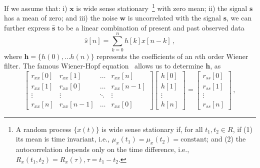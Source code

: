\documentclass[paper-main.tex]{subfiles}
\begin{document}
If we assume that: i) $\textbf{x}$ is wide sense stationary~\footnote{ A random process $\{x(t)\}$ is wide sense stationary if, for all $t_1,t_2 \in R$, if (1) its mean is time invariant, i.e., $\mu_x(t_1)=\mu_x(t_2)=\text{constant}$; and (2) the autocorrelation depends only on the time difference, i.e., $R_x(t_1,t_2)=R_x(\tau),\tau=t_1-t_2$.} with zero mean; ii) the signal $\textbf{s}$ has a mean of zero; and iii) the noise $\textbf{w}$ is uncorrelated with the signal $\textbf{s}$, we can further express $\hat{\textbf{s}}$ to be a linear combination of present and past observed data
\begin{equation}
\hat{{s}}[n]=\sum_{k=0}^{n}h[k]x[n-k]\,,
\end{equation}
where $\textbf{h}=\{h(0),\dots h(n)\}$ represents the coefficients of an $n$th order Wiener filter.
The famous Wiener-Hopf equation~\citep{noble1959methods} allows us to determine $\textbf{h}$, as\begin{equation}
\label{eqn:wiener-hopf}
\begin{bmatrix}  
r_{xx}[0]&r_{xx}[1]&\dots& r_{xx}[n]\\
r_{xx}[1]&r_{xx}[0]&\dots &r_{xx}[n-1]\\
\vdots&\vdots&\ddots&\vdots\\
r_{xx}[n]&r_{xx}[n-1]&\dots &r_{xx}[0]
\end{bmatrix}
\begin{bmatrix}
h[0]\\
h[1]\\
\vdots\\
h[n]
\end{bmatrix}=
\begin{bmatrix}
r_{ss}[0]\\
r_{ss}[1]\\
\vdots\\
r_{ss}[n]
\end{bmatrix}\,,
\end{equation}
\end{document}
